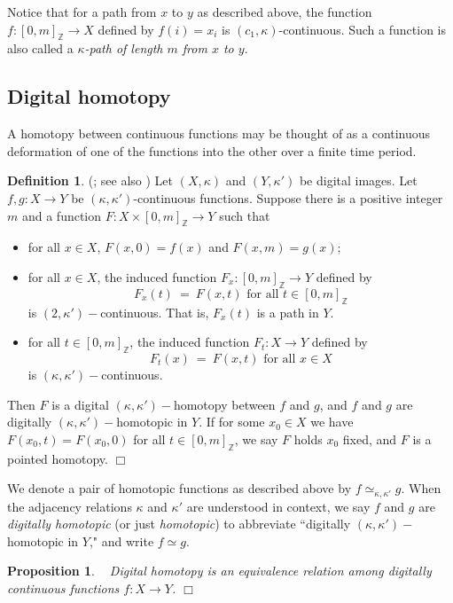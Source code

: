 \documentclass{article}
\theoremstyle{plain}
\newtheorem{prop}[thm]{Proposition}
\theoremstyle{definition}
\newtheorem{definition}[thm]{Definition}
\numberwithin{thm}{section}
\def\Z{{\mathbb Z}}
\begin{document}
Notice that for a path from $x$ to $y$ as
described above, the function
$f: [0,m]_{\Z} \to X$ defined by
$f(i)=x_i$ is $(c_1,\kappa)$-continuous. Such
a function is also called a {\em 
$\kappa$-path of length $m$ from $x$ to $y$}.

\subsection{Digital homotopy}
A homotopy between continuous functions may be thought of as
a continuous deformation of one of the functions into the 
other over a finite time period.

\begin{definition}{\rm (\cite{Boxer99}; see also \cite{Khalimsky})}
\label{htpy-2nd-def}
Let $(X,\kappa)$ and $(Y,\kappa')$ be digital images.
Let $f,g: X \rightarrow Y$ be $(\kappa,\kappa')$-continuous functions.
Suppose there is a positive integer $m$ and a function
$F: X \times [0,m]_{{\Z}} \rightarrow Y$
such that

\begin{itemize}
\item for all $x \in X$, $F(x,0) = f(x)$ and $F(x,m) = g(x)$;
\item for all $x \in X$, the induced function
      $F_x: [0,m]_{{\Z}} \rightarrow Y$ defined by
          \[ F_x(t) ~=~ F(x,t) \mbox{ for all } t \in [0,m]_{{\Z}} \]
          is $(2,\kappa')-$continuous. That is, $F_x(t)$ is a path in $Y$.
\item for all $t \in [0,m]_{{\Z}}$, the induced function
         $F_t: X \rightarrow Y$ defined by
          \[ F_t(x) ~=~ F(x,t) \mbox{ for all } x \in  X \]
          is $(\kappa,\kappa')-$continuous.
\end{itemize}
Then $F$ is a {\rm digital $(\kappa,\kappa')-$homotopy between} $f$ and
$g$, and $f$ and $g$ are {\rm digitally $(\kappa,\kappa')-$homotopic in} $Y$.
If for some $x_0 \in X$ we have $F(x_0,t)=F(x_0,0)$ for all
$t \in [0,m]_{{\Z}}$, we say $F$ {\rm holds $x_0$ fixed}, and $F$ is a
{\rm pointed homotopy}.
$\Box$
\end{definition}

We denote a pair of homotopic functions as
described above by $f \simeq_{\kappa,\kappa'} g$.
When the adjacency relations $\kappa$ and $\kappa'$ are understood in context,
we say $f$ and $g$ are {\em digitally homotopic} (or just {\em homotopic})
to abbreviate ``digitally 
$(\kappa,\kappa')-$homotopic in $Y$," and write
$f \simeq g$.

\begin{prop}
\label{htpy-equiv-rel}
{\rm ~\cite{Khalimsky,Boxer99}}
Digital homotopy is an equivalence relation among
digitally continuous functions $f: X \rightarrow Y$.
$\Box$
\end{prop}
\end{document}
